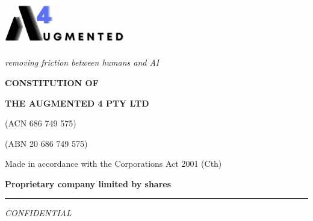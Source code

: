 \documentclass[12pt,a4paper]{article}
\begin{document}
\begin{titlepage}
    \centering
    \vspace*{1cm}
    
    \includegraphics[width=0.4\textwidth]{../images/email.jpg}
    \vspace{0.5cm}
    
    {\normalsize\itshape removing friction between humans and AI}
    \vspace{1.5cm}
    
    {\LARGE\textbf{CONSTITUTION OF}}
    \vspace{1cm}
    
    {\Large\textbf{THE AUGMENTED 4 PTY LTD}}
    \vspace{0.5cm}
    
    {\normalsize (ACN 686 749 575)}
    \vspace{0.2cm}
    
    {\normalsize (ABN 20 686 749 575)}
    \vspace{2cm}
    
    {\large Made in accordance with the Corporations Act 2001 (Cth)}
    \vspace{1cm}
    
    {\large\textbf{Proprietary company limited by shares}}
    \vspace{3cm}
    
    \rule{0.5\textwidth}{0.5pt}
    
    \vspace{0.5cm}
    {\small\itshape CONFIDENTIAL}
\end{titlepage}

\newpage
\end{document}
